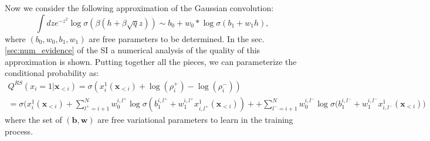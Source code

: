 \documentclass[10pt, notitlepage]{revtex4-2}
\begin{document}
Now we consider the following approximation of the Gaussian convolution:
\[
\int dz e^{-z^2}
\log \sigma \left(\beta \left(
h +\beta \sqrt{q}z \right)\right) \sim b_0 + w_0*\log \sigma(b_1 + w_1 h), 
\]
where $(b_0, w_0, b_1,w_1)$ are free parameters to be determined. In the sec.\ref{sec:num_evidence} of the SI a numerical analysis of the quality of this approximation is shown. 
Putting together all the pieces, we can parameterize the conditional probability as:
\begin{multline}
Q^{RS}\left(x_{i}=1|\mathbf{x}_{<i}\right) = \sigma\left( 
    x_i^1(\mathbf{x}_{<i}) +\log(\rho_i^+) - \log(\rho_i^-)
\right) \\
 = \sigma \bigg( x_i^1(\mathbf{x}_{<i}) + \sum_{l^+=i+1}^{N}  w_0^{i,l^+} \log\sigma(b_1^{i,l^+} +
 w_1^{i,l^+} x_{i,l^+}^1(\mathbf{x}_{<i}))+ 
 + \sum_{l^-=i+1}^{N}  w_0^{i,l^-} \log\sigma(b_1^{i,l^-} + w_1^{i,l^-} x_{i,l^-}^1(\mathbf{x}_{<i})
 \bigg) 
\end{multline}
where the set of $(\mathbf{b},\mathbf{w})$ are free variational parameters to learn in the training process. 
\end{document}
